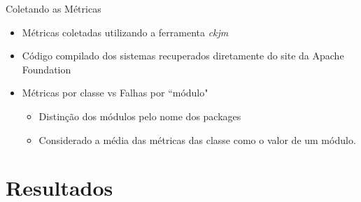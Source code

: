 \documentclass[t,14pt,mathserif]{beamer}
\begin{document}
\begin{frame}{Coletando as Métricas}

	\begin{itemize}
		\item Métricas coletadas utilizando a ferramenta \textit{ckjm}\cite{Jur10}
		\item Código compilado dos sistemas recuperados diretamente do site da Apache Foundation
		\item Métricas por classe vs Falhas por ``módulo"
		\begin{itemize}
			\item Distinção dos módulos pelo nome dos packages
			\item Considerado a média das métricas das classe como o valor de um módulo.
		\end{itemize}
	\end{itemize}


\end{frame}
\section{Resultados}
\end{document}
